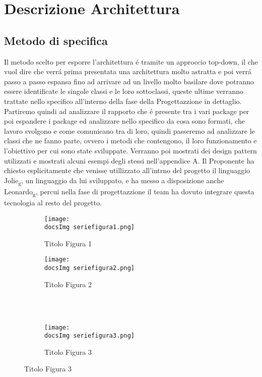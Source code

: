 \section{Descrizione Architettura}{
	
	\subsection{Metodo di specifica}{
	
	    Il metodo scelto per esporre l'architettura é tramite un approccio top-down, il che vuol dire che verrá prima presentata una architettura molto astratta e poi verrá passo a passo espansa fino ad arrivare 
	    ad un livello molto basilare dove potranno essere identificate le singole classi e le loro sottoclassi, queste ultime verranno trattate nello specifico all'interno della fase della Progettazzione in dettaglio. 
	    Partiremo quindi ad analizzare il rapporto che é presente tra i vari package per poi espandere i package ed analizzare nello specifico da cosa sono formati, che lavoro svolgono e come comunicano tra di loro,
	    quindi passeremo ad analizzare le classi che ne fanno parte, ovvero i metodi che contengono, il loro funzionamento e l'obiettivo per cui sono state sviluppate. Verranno poi mostrati dei design pattern utilizzati
	    e mostrati alcuni esempi degli stessi nell'appendice A.	Il Proponente ha chiesto esplicitamente che venisse utillizzato all'intrno del progetto il linguaggio Jolie\textsubscript{g}, un linguaggio da lui sviluppato,
	    e ha messo a disposizione anche Leonardo\textsubscript{g}, percui nella fase di progettazzione il team ha dovuto integrare questa tecnologia al resto del progetto.
		
		\begin{figure}[ht]
			\begin{subfigure}[b]{0.5\textwidth}
				\texttt{[image: \\docsImg seriefigura1.png]}
				\caption{Titolo Figura 1}
				\label{Titolo Figura 1}
			\end{subfigure}
			\begin{subfigure}[b]{0.5\textwidth}
				\texttt{[image: \\docsImg seriefigura2.png]}
				\caption{Titolo Figura 2}
				\label{Titolo Figura 2}
			\end{subfigure}
			\\
			\\
			\begin{subfigure}[b]{0.5\textwidth}
				\texttt{[image: \\docsImg seriefigura3.png]}
				\caption{Titolo Figura 3}
				\label{Titolo Figura 3}
			\end{subfigure}
		\end{figure}
	}
}
